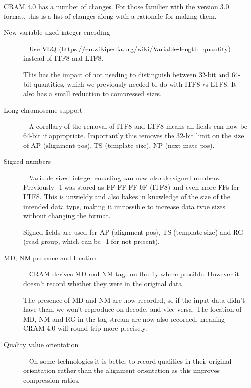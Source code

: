 \documentclass[a4paper]{article}
\begin{document}
CRAM 4.0 has a number of changes.  For those familier with the version
3.0 format, this is a list of changes along with a rationale for
making them.

\begin{description}
\item[New variable sized integer encoding]\ \newline
  Use VLQ (https://en.wikipedia.org/wiki/Variable-length\_quantity)
  instead of ITF8 and LTF8.

  This has the impact of not needing to distinguish between 32-bit and
  64-bit quantities, which we previously needed to do with ITF8 vs
  LTF8.  It also has a small reduction to compressed sizes.


\item[Long chromosome support]\ \newline
  A corollary of the removal of ITF8 and LTF8 means all fields
  can now be 64-bit if appropriate.  Importantly this removes the
  32-bit limit on the size of AP (alignment pos), TS (template size),
  NP (next mate pos).


\item[Signed numbers]\ \newline
  Variable sized integer encoding can now also do signed numbers.
  Previously -1 was stored as FF FF FF 0F (ITF8) and even more FFs
  for LTF8.  This is unwieldy and also bakes in knowledge of the
  size of the intended data type, making it impossible to increase
  data type sizes without changing the format.

  Signed fields are used for AP (alignment pos), TS (template size)
  and RG (read group, which can be -1 for not present).


\item[MD, NM presence and location]\ \newline
  CRAM derives MD and NM tags on-the-fly where possible.  However it
  doesn't record whether they were in the original data.

  The presence of MD and NM are now recorded, so if the input data didn't
  have them we won't reproduce on decode, and vice versa.  The
  location of MD, NM and RG in the tag stream are now also recorded,
  meaning CRAM 4.0 will round-trip more precisely.


\item[Quality value orientation]\ \newline
  On some technologies it is better to record qualities in their
  original orientation rather than the alignment orientation as this
  improves compression ratios.


\end{description}
\end{document}
